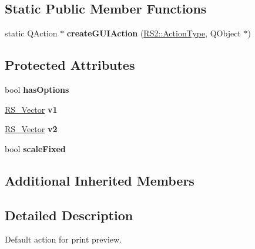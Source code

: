 \subsection*{Static Public Member Functions}
\begin{DoxyCompactItemize}
\item 
\hypertarget{classRS__ActionPrintPreview_affc6f19cc9fcb6ce585753413b335d64}{static Q\-Action $\ast$ {\bfseries create\-G\-U\-I\-Action} (\hyperlink{classRS2_afe3523e0bc41fd637b892321cfc4b9d7}{R\-S2\-::\-Action\-Type}, Q\-Object $\ast$)}\label{classRS__ActionPrintPreview_affc6f19cc9fcb6ce585753413b335d64}

\end{DoxyCompactItemize}
\subsection*{Protected Attributes}
\begin{DoxyCompactItemize}
\item 
\hypertarget{classRS__ActionPrintPreview_a74f95281aa129131f134f847c3ec9ae1}{bool {\bfseries has\-Options}}\label{classRS__ActionPrintPreview_a74f95281aa129131f134f847c3ec9ae1}

\item 
\hypertarget{classRS__ActionPrintPreview_a3eae8f6b9065b474948670056b62fed1}{\hyperlink{classRS__Vector}{R\-S\-\_\-\-Vector} {\bfseries v1}}\label{classRS__ActionPrintPreview_a3eae8f6b9065b474948670056b62fed1}

\item 
\hypertarget{classRS__ActionPrintPreview_a4c3f7d4b6375df6a9a6b49bcfcdd6500}{\hyperlink{classRS__Vector}{R\-S\-\_\-\-Vector} {\bfseries v2}}\label{classRS__ActionPrintPreview_a4c3f7d4b6375df6a9a6b49bcfcdd6500}

\item 
\hypertarget{classRS__ActionPrintPreview_ab70b3e699e365684ad71c5301cebc1c1}{bool {\bfseries scale\-Fixed}}\label{classRS__ActionPrintPreview_ab70b3e699e365684ad71c5301cebc1c1}

\end{DoxyCompactItemize}
\subsection*{Additional Inherited Members}


\subsection{Detailed Description}
Default action for print preview.

